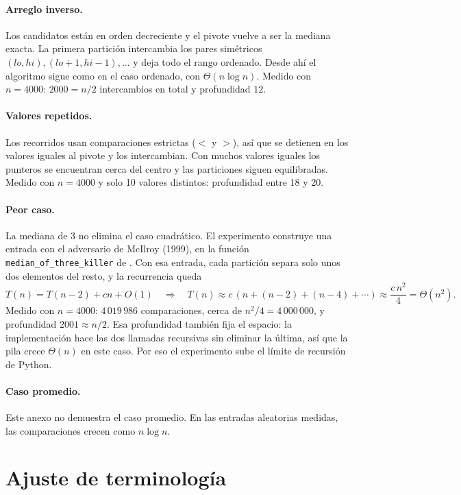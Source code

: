 \documentclass[11pt]{article}
\begin{document}
\paragraph{Arreglo inverso.} Los candidatos están en orden decreciente y el pivote vuelve a ser la mediana exacta. La primera partición intercambia los pares simétricos $(lo, hi), (lo+1, hi-1), \ldots$ y deja todo el rango ordenado. Desde ahí el algoritmo sigue como en el caso ordenado, con $\Theta(n \log n)$. Medido con $n = 4000$: $2000 = n/2$ intercambios en total y profundidad $12$.

\paragraph{Valores repetidos.} Los recorridos usan comparaciones estrictas ($<$ y $>$), así que se detienen en los valores iguales al pivote y los intercambian. Con muchos valores iguales los punteros se encuentran cerca del centro y las particiones siguen equilibradas. Medido con $n = 4000$ y solo 10 valores distintos: profundidad entre 18 y 20.

\paragraph{Peor caso.} La mediana de 3 no elimina el caso cuadrático. El experimento construye una entrada con el adversario de McIlroy (1999), en la función \texttt{median\_of\_three\_killer} de . Con esa entrada, cada partición separa solo unos dos elementos del resto, y la recurrencia queda
\[
T(n) = T(n-2) + cn + O(1) \quad\Longrightarrow\quad T(n) \approx c\,(n + (n-2) + (n-4) + \cdots) \approx \frac{c\,n^2}{4} = \Theta(n^2).
\]
Medido con $n = 4000$: $4\,019\,986$ comparaciones, cerca de $n^2/4 = 4\,000\,000$, y profundidad $2001 \approx n/2$. Esa profundidad también fija el espacio: la implementación hace las dos llamadas recursivas sin eliminar la última, así que la pila crece $\Theta(n)$ en este caso. Por eso el experimento sube el límite de recursión de Python.

\paragraph{Caso promedio.} Este anexo no demuestra el caso promedio. En las entradas aleatorias medidas, las comparaciones crecen como $n \log n$.

\section{Ajuste de terminología}
\end{document}
